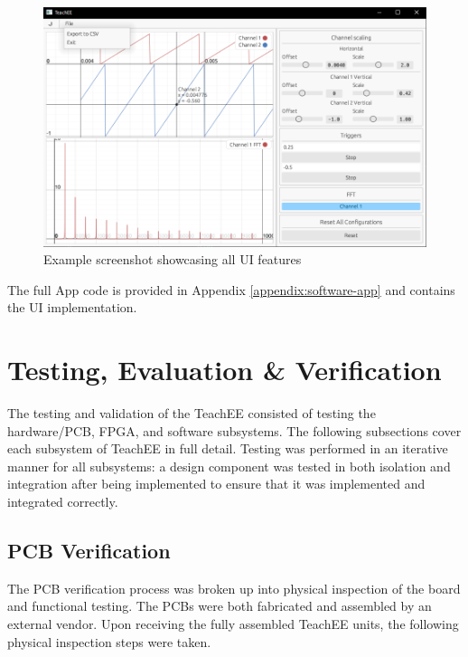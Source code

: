 \documentclass[letterpaper,11pt]{article}
\begin{document}
\begin{figure}[H]
  \centering
  \includegraphics[width=\textwidth]{figures/software-ui.png}
  \caption{Example screenshot showcasing all UI features}
  \label{fig:soft-ui}
\end{figure}

The full App code is provided in Appendix \ref{appendix:software-app} and contains
the UI implementation.

\section{Testing, Evaluation \& Verification} \label{sec:testing}
The testing and validation of the TeachEE consisted of testing the hardware/PCB,
FPGA, and software subsystems. The following subsections cover each subsystem of
TeachEE in full detail. Testing was performed in an iterative manner for all
subsystems: a design component was tested in both isolation and integration after being
implemented to ensure that it was implemented and integrated correctly.

\subsection{PCB Verification} %
The PCB verification process was broken up into physical inspection of the board
and functional testing. The PCBs were both fabricated and assembled by an
external vendor. Upon receiving the fully assembled TeachEE units, the following
physical inspection steps were taken.
\end{document}
